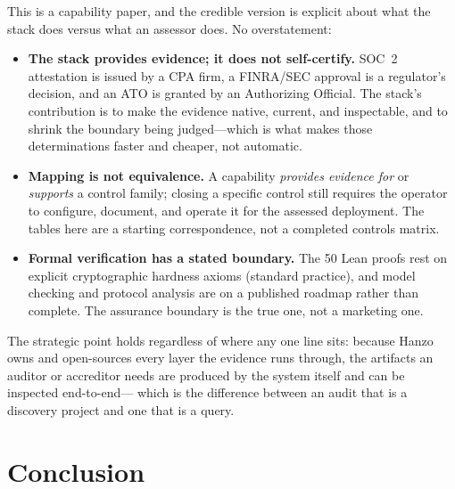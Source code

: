 \documentclass[11pt,letterpaper]{article}
\begin{document}
This is a capability paper, and the credible version is explicit about what the stack
does versus what an assessor does. No overstatement:

\begin{itemize}
  \item \textbf{The stack provides evidence; it does not self-certify.} SOC~2 attestation
  is issued by a CPA firm, a FINRA/SEC approval is a regulator's decision, and an ATO is
  granted by an Authorizing Official. The stack's contribution is to make the evidence
  native, current, and inspectable, and to shrink the boundary being judged---which is
  what makes those determinations faster and cheaper, not automatic.
  \item \textbf{Mapping is not equivalence.} A capability \emph{provides evidence for}
  or \emph{supports} a control family; closing a specific control still requires the
  operator to configure, document, and operate it for the assessed deployment. The
  tables here are a starting correspondence, not a completed controls matrix.
  \item \textbf{Formal verification has a stated boundary.} The 50 Lean proofs rest on
  explicit cryptographic hardness axioms (standard practice), and model checking and
  protocol analysis are on a published roadmap rather than complete. The assurance
  boundary is the true one, not a marketing one.
\end{itemize}

The strategic point holds regardless of where any one line sits: because Hanzo owns
and open-sources every layer the evidence runs through, the artifacts an auditor or
accreditor needs are produced by the system itself and can be inspected end-to-end---
which is the difference between an audit that is a discovery project and one that is a
query.

\section{Conclusion}
\end{document}
